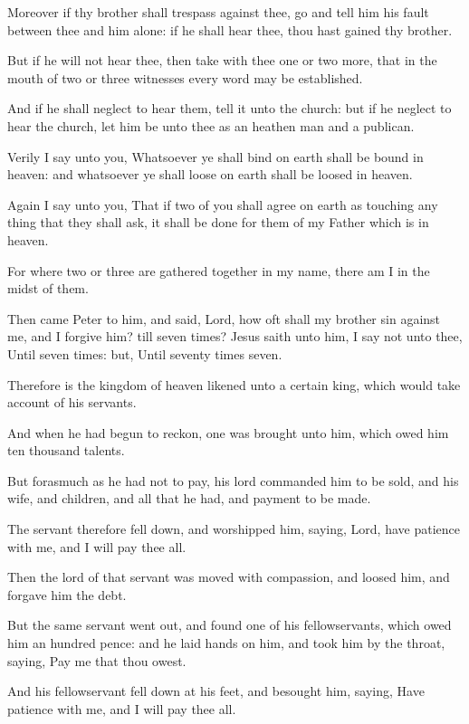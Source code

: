 \Verse Moreover if thy brother shall trespass against thee, go and tell him his fault between thee and him alone: if he shall hear thee, thou hast gained thy brother.

\Verse But if he will not hear thee, then take with thee one or two more, that in the mouth of two or three witnesses every word may be established.

\Verse And if he shall neglect to hear them, tell it unto the church: but if he neglect to hear the church, let him be unto thee as an heathen man and a publican.

\Verse Verily I say unto you, Whatsoever ye shall bind on earth shall be bound in heaven: and whatsoever ye shall loose on earth shall be loosed in heaven.

\Verse Again I say unto you, That if two of you shall agree on earth as touching any thing that they shall ask, it shall be done for them of my Father which is in heaven.

\Verse For where two or three are gathered together in my name, there am I in the midst of them.

\Verse Then came Peter to him, and said, Lord, how oft shall my brother sin against me, and I forgive him? till seven times?  \Verse Jesus saith unto him, I say not unto thee, Until seven times: but, Until seventy times seven.

\Verse Therefore is the kingdom of heaven likened unto a certain king, which would take account of his servants.

\Verse And when he had begun to reckon, one was brought unto him, which owed him ten thousand talents.

\Verse But forasmuch as he had not to pay, his lord commanded him to be sold, and his wife, and children, and all that he had, and payment to be made.

\Verse The servant therefore fell down, and worshipped him, saying, Lord, have patience with me, and I will pay thee all.

\Verse Then the lord of that servant was moved with compassion, and loosed him, and forgave him the debt.

\Verse But the same servant went out, and found one of his fellowservants, which owed him an hundred pence: and he laid hands on him, and took him by the throat, saying, Pay me that thou owest.

\Verse And his fellowservant fell down at his feet, and besought him, saying, Have patience with me, and I will pay thee all.

